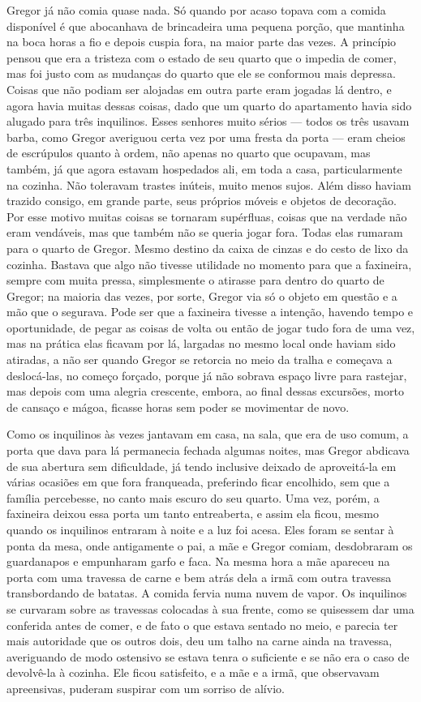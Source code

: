 Gregor já não comia quase nada. Só quando por acaso topava com a comida
disponível é que abocanhava de brincadeira uma pequena porção, que
mantinha na boca horas a fio e depois cuspia fora, na maior parte das
vezes. A princípio pensou que era a tristeza com o estado de seu quarto
que o impedia de comer, mas foi justo com as mudanças do quarto que ele se
conformou mais depressa. Coisas que não podiam ser alojadas em outra parte
eram jogadas lá dentro, e agora havia muitas dessas coisas, dado que um
quarto do apartamento havia sido alugado para três inquilinos. Esses
senhores muito sérios --- todos os três usavam barba, como Gregor averiguou
certa vez por uma fresta da porta --- eram cheios de escrúpulos quanto à
ordem, não apenas no quarto que ocupavam, mas também, já que agora estavam
hospedados ali, em toda a casa, particularmente na cozinha. Não toleravam
trastes inúteis, muito menos sujos. Além disso haviam trazido consigo, em
grande parte, seus próprios móveis e objetos de decoração. Por esse motivo
muitas coisas se tornaram supérfluas, coisas que na verdade não eram
vendáveis, mas que também não se queria jogar fora. Todas elas rumaram
para o quarto de Gregor. Mesmo destino da caixa de cinzas e do cesto de
lixo da cozinha. Bastava que algo não tivesse utilidade no momento para
que a faxineira, sempre com muita pressa, simplesmente o atirasse para
dentro do quarto de Gregor; na maioria das vezes, por sorte, Gregor via só
o objeto em questão e a mão que o segurava. Pode ser que a faxineira
tivesse a intenção, havendo tempo e oportunidade, de pegar as coisas de
volta ou então de jogar tudo fora de uma vez, mas na prática elas ficavam
por lá, largadas no mesmo local onde haviam sido atiradas, a não ser
quando Gregor se retorcia no meio da tralha e começava a deslocá-las, no
começo forçado, porque já não sobrava espaço livre para rastejar, mas
depois com uma alegria crescente, embora, ao final dessas excursões, morto
de cansaço e mágoa, ficasse horas sem poder se movimentar de novo.

Como os inquilinos às vezes jantavam em casa, na sala, que era de uso
comum, a porta que dava para lá permanecia fechada algumas noites, mas
Gregor abdicava de sua abertura sem dificuldade, já tendo inclusive
deixado de aproveitá-la em várias ocasiões em que fora franqueada,
preferindo ficar encolhido, sem que a família percebesse, no canto mais
escuro do seu quarto. Uma vez, porém, a faxineira deixou essa porta um
tanto entreaberta, e assim ela ficou, mesmo quando os inquilinos entraram
à noite e a luz foi acesa. Eles foram se sentar à ponta da mesa, onde
antigamente o pai, a mãe e Gregor comiam, desdobraram os guardanapos e
empunharam garfo e faca. Na mesma hora a mãe apareceu na porta com uma
travessa de carne e bem atrás dela a irmã com outra travessa transbordando
de batatas. A comida fervia numa nuvem de vapor. Os inquilinos se curvaram
sobre as travessas colocadas à sua frente, como se quisessem dar uma
conferida antes de comer, e de fato o que estava sentado no meio, e
parecia ter mais autoridade que os outros dois, deu um talho na carne
ainda na travessa, averiguando de modo ostensivo se estava tenra o
suficiente e se não era o caso de devolvê-la à cozinha. Ele ficou
satisfeito, e a mãe e a irmã, que observavam apreensivas, puderam suspirar
com um sorriso de alívio.

